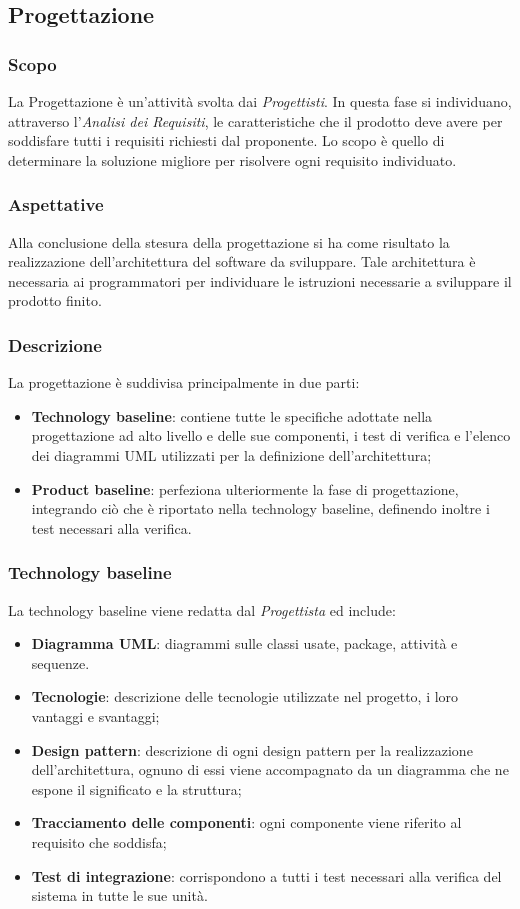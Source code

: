 \subsection{Progettazione}\label{2.2.4}
\subsubsection{Scopo}\label{2.2.4.1}
La Progettazione è un'attività svolta dai \textit{Progettisti}. In questa fase si individuano, attraverso l'\textit{Analisi dei Requisiti}, le caratteristiche che il prodotto deve avere per soddisfare tutti i requisiti richiesti dal proponente. Lo scopo è quello di determinare la soluzione migliore per risolvere ogni requisito individuato. 
\subsubsection{Aspettative}\label{2.2.4.2}
Alla conclusione della stesura della progettazione si ha come risultato la realizzazione dell'architettura del software da sviluppare. Tale architettura è necessaria ai programmatori per individuare le istruzioni necessarie a sviluppare il prodotto finito.
\subsubsection{Descrizione}\label{2.2.4.3}
La progettazione è suddivisa principalmente in due parti:
\begin{itemize}
	\item \textbf{Technology baseline}: contiene tutte le specifiche adottate nella progettazione ad alto livello e delle sue componenti, i test di verifica e l'elenco dei diagrammi UML utilizzati per la definizione dell'architettura;
	\item \textbf{Product baseline}: perfeziona ulteriormente la fase di progettazione, integrando ciò che è riportato nella technology baseline, definendo inoltre i test necessari alla verifica.
\end{itemize}

\subsubsection{Technology baseline}
La technology baseline viene redatta dal \textit{Progettista} ed include:
\begin{itemize}
	\item \textbf{Diagramma UML}: diagrammi sulle classi usate, package, attività e sequenze.
	\item \textbf{Tecnologie}: descrizione delle tecnologie utilizzate nel progetto, i loro vantaggi e svantaggi;
	\item \textbf{Design pattern}: descrizione di ogni design pattern per la realizzazione dell'architettura, ognuno di essi viene accompagnato da un diagramma che ne espone il significato e la struttura; 
	\item \textbf{Tracciamento delle componenti}: ogni componente viene riferito al requisito che soddisfa;
	\item \textbf{Test di integrazione}: corrispondono a tutti i test necessari alla verifica del sistema in tutte le sue unità.
\end{itemize}
